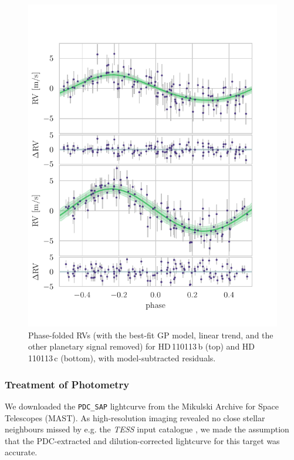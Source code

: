 \documentclass[fleqn,usenatbib]{mnras}
\newcommand{\tess}{{\it TESS}}
\newcommand{\Tplanet}{HD\,110113\,b}
\newcommand{\Tplanetc}{HD\,110113\,c}
\begin{document}
\begin{figure}
	\includegraphics[width=\columnwidth, trim={0.1cm 0.8cm 1.0cm 0.85cm}]{Phase_folded_RV_plots_3_GPs_final.pdf}
    \caption{Phase-folded RVs (with the best-fit GP model, linear trend, and the other planetary signal removed) for \Tplanet{} (top) and \Tplanetc{} (bottom), with model-subtracted residuals. }
    \label{fig:phase_fold_rvs}
\end{figure}

\subsubsection{Treatment of Photometry}
We downloaded the \texttt{PDC\_SAP} lightcurve from the Mikulski Archive for Space Telescopes (MAST).
As high-resolution imaging revealed no close stellar neighbours missed by e.g. the \tess{} input catalogue \citep{stassun2019revised}, we made the assumption that the PDC-extracted and dilution-corrected lightcurve for this target was accurate.
\end{document}
